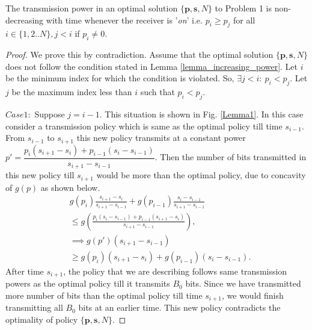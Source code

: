 
\begin{lemma}
The transmission power in an optimal solution $\{\textbf{p},\textbf{s},N\}$ to Problem 1 is non-decreasing with time whenever the receiver is '\textit{on}' i.e. $p_i\ge p_j$ for all $i\in \{1,2..N\},j<i$ if $p_i\neq 0$. 
\label{lemma_increasing_power}
\end{lemma}
\begin{proof}
We prove this by contradiction. Assume that the optimal solution $\{\textbf{p},\textbf{s},N\}$ does not follow the condition stated in Lemma \ref{lemma_increasing_power}. Let $i$ be the minimum index for which the condition is violated. So, $\exists j<i:\ p_i<p_j $. Let $j$ be the maximum index less than $i$ such that $p_i<p_j$. 

%

$Case 1:$ Suppose $j=i-1$. This situation is shown in Fig. \ref{Lemma1}. In this case consider a transmission policy which is same as the optimal policy till time $s_{i-1}$. From $s_{i-1}$ to $s_{i+1}$ this new policy transmits at a constant power $p'=\dfrac{p_i(s_{i+1}-s_{i})+p_{i-1}(s_{i}-s_{i-1})}{s_{i+1}-s_{i-1}}$. Then the number of bits transmitted in this new policy till $s_{i+1}$ would be more than the optimal policy, due to concavity of $g(p)$ as shown below.
\begin{align*}
&g(p_i)\frac{s_{i+1}-s_{i}}{s_{i+1}-s_{i-1}}+g(p_{i-1})\frac{s_{i}-s_{i-1}}{s_{i+1}-s_{i-1}}
\\ 
&\le g\left(\frac{p_i(s_{i}-s_{i-1})+p_{i-1}(s_{i+1}-s_{i})}{s_{i+1}-s_{i-1}}\right),
\\
&\implies g(p')(s_{i+1}-s_{i-1})
\\
&\ge g(p_i)(s_{i+1}-s_{i})+g(p_{i-1})(s_{i}-s_{i-1}).  
\end{align*}
After time $s_{i+1}$, the policy that we are describing follows same transmission powers as the optimal policy till it transmits $B_0$ bits. Since we have transmitted more number of bits than the optimal policy till time $s_{i+1}$, we would finish transmitting all $B_0$ bits at an earlier time. This new policy contradicts the optimality of policy $\{\textbf{p},\textbf{s},N\}$.


\end{proof}
